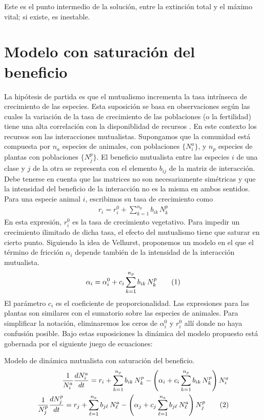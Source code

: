 Este es el punto intermedio de la solución, entre la extinción total y el máximo vital; si existe, es inestable.

\clearpage
\section{Modelo con saturación del beneficio}

La hipótesis de partida es que el mutualismo incrementa la tasa intrínseca de crecimiento de las especies. Esta suposición se basa en observaciones según las cuales la variación de la tasa de crecimiento de las poblaciones (o la fertilidad) tiene una alta correlación con la disponiblidad de recursos \cite{stenseth1998,krebs2002,rueness2003,tyler2008,jones2008}. En este contexto los recursos son las interacciones mutualistas. Supongamos que la comunidad está compuesta por $n_a$ especies de animales, con poblaciones $\{N_{i}^a\}$, y $n_p$ especies de plantas con poblaciones $\{N_{j}^p\}$. El beneficio mutualista entre las especies $i$  de una clase y $j$ de la otra se representa con el elemento $b_{ij}$ de la matriz de interacción. Debe tenerse en cuenta que las matrices no son necesariamente simétricas y que la intensidad del beneficio de la interacción no es la misma en ambos sentidos. Para una especie animal $i$, escribimos su tasa de crecimiento como
\begin{align}
r_{i} = r_{i}^{0} + \sum_{k=1}^{n_{p}} b_{ik}\, N^{p}_k
\label{eq:expr}
\end{align}
En esta expresión, $r_{i}^{0}$ es la tasa de crecimiento vegetativo. Para impedir un crecimiento ilimitado de dicha tasa, el efecto del mutualismo tiene que saturar en cierto punto. Siguiendo la idea de Velhurst, proponemos un modelo en el que el término de fricción $\alpha_i$ depende también de la intensidad de la interacción mutualista. 
\begin{align}
\alpha_i = \alpha_{i}^{0}+ c_{i} \sum_{k=1}^{n_{p}} b_{ik}\, N^{p}_k 
\stepcounter{equation}\tag{\theequation}
\label{eq:alphavariable}
\end{align}
El parámetro $c_{i}$ es el coeficiente de proporcionalidad. Las expresiones para las plantas son similares con el sumatorio sobre las especies de animales. Para simplificar la notación, eliminaremos los ceros de $\alpha_{i}^{0}$ y $r_{i}^{0}$ allí donde no haya confusión posible. Bajo estas suposiciones la dinámica del modelo propuesto está gobernada por el siguiente juego de ecuaciones:

\begin{theo} 
Modelo de dinámica mutualista con saturación del beneficio.
\begin{align*}
\frac{1}{N^{a}_{i}}\frac{dN^{a}_{i}}{dt} = r_{i}+ \sum_{k=1}^{n_{p}} b_{ik}\, N^{p}_k - \left( \alpha_{i}+ c_{i} \sum_{k=1}^{n_{p}} b_{ik}\, N^{p}_k \right) N^{a}_{i} \nonumber\\
\frac{1}{N^{p}_{j}}\frac{dN^{p}_{j}}{dt} = r_{j}+ \sum_{\ell=1}^{n_{a}} b_{j\ell}\, N^{a}_\ell - \left( \alpha_{j}+ c_{j} \sum_{\ell=1}^{n_{a}} b_{j\ell}\, N^{a}_\ell \right) N^{p}_{j}
\stepcounter{equation}\tag{\theequation}\label{eq:DINAMICA_modeloralphaconmut}
\end{align*}
\end{theo}


